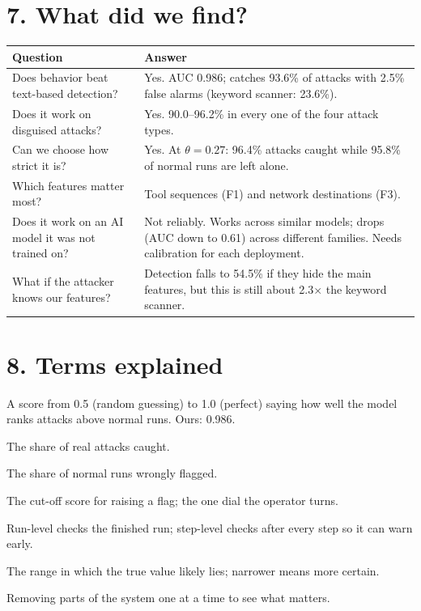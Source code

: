 \documentclass[11pt]{article}
\begin{document}
\section*{7. What did we find?}
\begin{center}
\begin{tabular}{p{7.6cm}p{6cm}}
\toprule
\textbf{Question} & \textbf{Answer}\\
\midrule
Does behavior beat text-based detection? & Yes. AUC 0.986; catches 93.6\% of attacks with 2.5\% false alarms (keyword scanner: 23.6\%).\\
Does it work on disguised attacks? & Yes. 90.0--96.2\% in every one of the four attack types.\\
Can we choose how strict it is? & Yes. At $\theta=0.27$: 96.4\% attacks caught while 95.8\% of normal runs are left alone.\\
Which features matter most? & Tool sequences (F1) and network destinations (F3).\\
Does it work on an AI model it was not trained on? & Not reliably. Works across similar models; drops (AUC down to 0.61) across different families. Needs calibration for each deployment.\\
What if the attacker knows our features? & Detection falls to 54.5\% if they hide the main features, but this is still about 2.3$\times$ the keyword scanner.\\
\bottomrule
\end{tabular}
\end{center}

\section*{8. Terms explained}
\begin{description}[leftmargin=2.2cm,style=nextline,nosep]
\item[AUC] A score from 0.5 (random guessing) to 1.0 (perfect) saying how well the model ranks attacks above normal runs. Ours: 0.986.
\item[Detection rate (DR)] The share of real attacks caught.
\item[False-positive rate (FPR)] The share of normal runs wrongly flagged.
\item[Threshold $\theta$] The cut-off score for raising a flag; the one dial the operator turns.
\item[Run-level vs.\ step-level] Run-level checks the finished run; step-level checks after every step so it can warn early.
\item[Confidence interval] The range in which the true value likely lies; narrower means more certain.
\item[Ablation] Removing parts of the system one at a time to see what matters.
\end{description}
\end{document}

